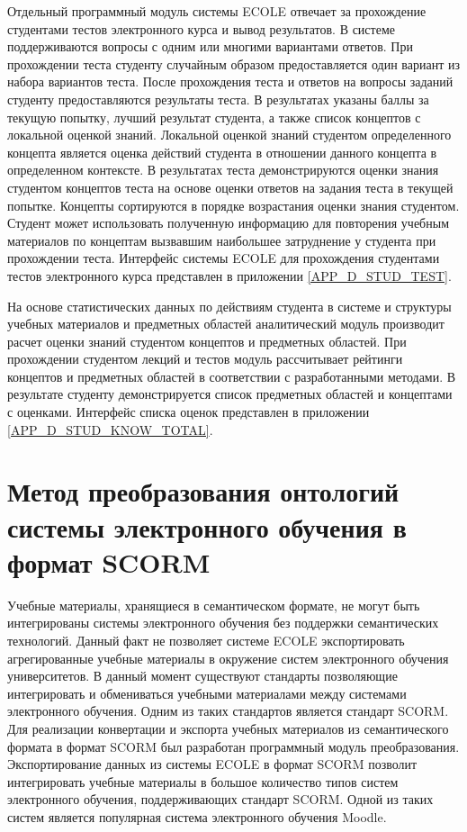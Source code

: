 Отдельный программный модуль системы ECOLE отвечает за прохождение студентами тестов электронного курса и вывод результатов. В системе поддерживаются вопросы с одним или многими вариантами ответов. При прохождении теста студенту случайным образом предоставляется один вариант из набора вариантов теста. После прохождения теста и ответов на вопросы заданий студенту предоставляются результаты теста. В результатах указаны баллы за текущую попытку, лучший результат студента, а также список концептов с локальной оценкой знаний. Локальной оценкой знаний студентом определенного концепта является оценка действий студента в отношении данного концепта в определенном контексте. В результатах теста демонстрируются оценки знания студентом концептов теста на основе оценки ответов на задания теста в текущей попытке. Концепты сортируются в порядке возрастания оценки знания студентом. Студент может использовать полученную информацию для повторения учебным материалов по концептам вызвавшим наибольшее затруднение у студента при прохождении теста. Интерфейс системы ECOLE для прохождения студентами тестов электронного курса представлен в приложении \ref{APP_D_STUD_TEST}.

На основе статистических данных по действиям студента в системе и структуры учебных материалов и предметных областей аналитический модуль производит расчет оценки знаний студентом концептов и предметных областей. При прохождении студентом лекций и тестов модуль рассчитывает рейтинги концептов и предметных областей в соответствии с разработанными методами. В результате студенту демонстрируется список предметных областей и концептами с оценками. Интерфейс списка оценок представлен в приложении \ref{APP_D_STUD_KNOW_TOTAL}.



\section{Метод преобразования онтологий системы электронного обучения в формат SCORM} \label{sect4_3}

Учебные материалы, хранящиеся в семантическом формате, не могут быть интегрированы системы электронного обучения без поддержки семантических технологий. Данный факт не позволяет системе ECOLE экспортировать агрегированные учебные материалы в окружение систем электронного обучения университетов. В данный момент существуют стандарты позволяющие интегрировать и обмениваться учебными материалами между системами электронного обучения. Одним из таких стандартов является стандарт SCORM. Для реализации конвертации и экспорта учебных материалов из семантического формата в формат SCORM был разработан программный модуль преобразования. Экспортирование данных из системы ECOLE в формат SCORM позволит интегрировать учебные материалы в большое количество типов систем электронного обучения, поддерживающих стандарт SCORM. Одной из таких систем является популярная система электронного обучения Moodle.

